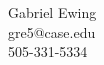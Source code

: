 \documentclass[11pt]{article}
\begin{document}
\begin{center}\large{Gabriel Ewing}\\[0.5\baselineskip]
gre5@case.edu\\
505-331-5334\end{center}
\end{document}
